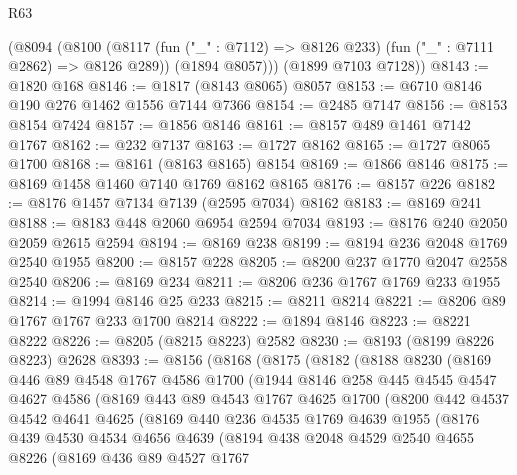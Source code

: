 \begin{lexlean}{R63}
\begin{coremodule}
      (@8094
        (@8100
          (@8117 (fun ("_" : @7112) => @8126 @233) (fun ("_" : @7111 @2862) => @8126 @289))
          (@1894 @8057)))
      (@1899 @7103 @7128))
@8143 := @1820 @168
@8146 := @1817 (@8143 @8065) @8057
@8153 := @6710 @8146 @190 @276 @1462 @1556 @7144 @7366
@8154 := @2485 @7147
@8156 := @8153 @8154 @7424
@8157 := @1856 @8146
@8161 := @8157 @489 @1461 @7142 @1767
@8162 := @232 @7137
@8163 := @1727 @8162
@8165 := @1727 @8065 @1700
@8168 := @8161 (@8163 @8165) @8154
@8169 := @1866 @8146
@8175 := @8169 @1458 @1460 @7140 @1769 @8162 @8165
@8176 := @8157 @226
@8182 := @8176 @1457 @7134 @7139 (@2595 @7034) @8162
@8183 := @8169 @241
@8188 := @8183 @448 @2060 @6954 @2594 @7034
@8193 := @8176 @240 @2050 @2059 @2615 @2594
@8194 := @8169 @238
@8199 := @8194 @236 @2048 @1769 @2540 @1955
@8200 := @8157 @228
@8205 := @8200 @237 @1770 @2047 @2558 @2540
@8206 := @8169 @234
@8211 := @8206 @236 @1767 @1769 @233 @1955
@8214 := @1994 @8146 @25 @233
@8215 := @8211 @8214
@8221 := @8206 @89 @1767 @1767 @233 @1700 @8214
@8222 := @1894 @8146
@8223 := @8221 @8222
@8226 := @8205 (@8215 @8223) @2582
@8230 := @8193 (@8199 @8226 @8223) @2628
@8393 := @8156
    (@8168
      (@8175
        (@8182
          (@8188
            @8230
            (@8169
              @446
              @89
              @4548
              @1767
              @4586
              @1700
              (@1944
                @8146
                @258
                @445
                @4545
                @4547
                @4627
                @4586
                (@8169
                  @443
                  @89
                  @4543
                  @1767
                  @4625
                  @1700
                  (@8200
                    @442
                    @4537
                    @4542
                    @4641
                    @4625
                    (@8169
                      @440
                      @236
                      @4535
                      @1769
                      @4639
                      @1955
                      (@8176
                        @439
                        @4530
                        @4534
                        @4656
                        @4639
                        (@8194
                          @438
                          @2048
                          @4529
                          @2540
                          @4655
                          @8226
                          (@8169
                            @436
                            @89
                            @4527
                            @1767

\end{coremodule}
\end{lexlean}
